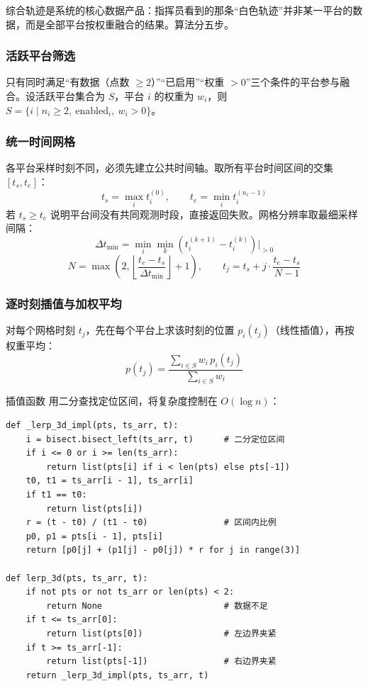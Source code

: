 综合轨迹是系统的核心数据产品：指挥员看到的那条“白色轨迹”并非某一平台的数据，而是全部平台按权重融合的结果。算法分五步。

\subsubsection{活跃平台筛选}

只有同时满足“有数据（点数 $\geq 2$）”“已启用”“权重 $>0$”三个条件的平台参与融合。设活跃平台集合为 $S$，平台 $i$ 的权重为 $w_i$，则 $S=\{i \mid n_i \geq 2,\ \text{enabled}_i,\ w_i>0\}$。

\subsubsection{统一时间网格}

各平台采样时刻不同，必须先建立公共时间轴。取所有平台时间区间的交集 $[t_s,t_e]$：
\begin{equation}
t_s=\max_i t_i^{(0)},\qquad t_e=\min_i t_i^{(n_i-1)}
\end{equation}
若 $t_s \geq t_e$ 说明平台间没有共同观测时段，直接返回失败。网格分辨率取最细采样间隔：
\begin{equation}
\Delta t_{\min}=\min_i \min_{k}\left(t_i^{(k+1)}-t_i^{(k)}\right)\Big|_{>0}
\end{equation}
\begin{equation}
N=\max\left(2,\left\lfloor\frac{t_e-t_s}{\Delta t_{\min}}\right\rfloor+1\right),\qquad
t_j=t_s+j\cdot\frac{t_e-t_s}{N-1}
\end{equation}

\subsubsection{逐时刻插值与加权平均}

对每个网格时刻 $t_j$，先在每个平台上求该时刻的位置 $p_i(t_j)$（线性插值），再按权重平均：
\begin{equation}
p(t_j)=\frac{\sum_{i\in S} w_i\,p_i(t_j)}{\sum_{i\in S} w_i}
\end{equation}

插值函数  用二分查找定位区间，将复杂度控制在 $O(\log n)$：

\begin{lstlisting}[style=py, caption={三维线性插值函数 lerp\_3d（core/math\_utils.py）}]
def _lerp_3d_impl(pts, ts_arr, t):
    i = bisect.bisect_left(ts_arr, t)      # 二分定位区间
    if i <= 0 or i >= len(ts_arr):
        return list(pts[i] if i < len(pts) else pts[-1])
    t0, t1 = ts_arr[i - 1], ts_arr[i]
    if t1 == t0:
        return list(pts[i])
    r = (t - t0) / (t1 - t0)               # 区间内比例
    p0, p1 = pts[i - 1], pts[i]
    return [p0[j] + (p1[j] - p0[j]) * r for j in range(3)]

def lerp_3d(pts, ts_arr, t):
    if not pts or not ts_arr or len(pts) < 2:
        return None                        # 数据不足
    if t <= ts_arr[0]:
        return list(pts[0])                # 左边界夹紧
    if t >= ts_arr[-1]:
        return list(pts[-1])               # 右边界夹紧
    return _lerp_3d_impl(pts, ts_arr, t)
\end{lstlisting}

